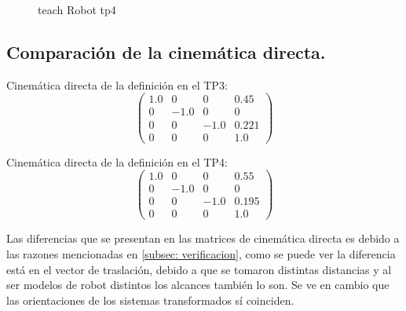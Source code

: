 \documentclass[a4paper,12pt]{article}
\begin{document}
\begin{figure}[H]
    \centering
    \begin{adjustbox}{scale = 0.85, max width=\columnwidth}
    \end{adjustbox}
    \caption{teach Robot tp4}
\end{figure}

\subsection{Comparación de la cinemática directa.}
Cinemática directa de la definición en el TP3: 
\[\left(\begin{array}{cccc} 1.0 & 0 & 0 & 0.45\\ 0 & -1.0 & 0 & 0\\ 0 & 0 & -1.0 & 0.221\\ 0 & 0 & 0 & 1.0 \end{array}\right)\]

Cinemática directa de la definición en el TP4: 
\[\left(\begin{array}{cccc} 1.0 & 0 & 0 & 0.55\\ 0 & -1.0 & 0 & 0\\ 0 & 0 & -1.0 & 0.195\\ 0 & 0 & 0 & 1.0 \end{array}\right)\]

Las diferencias que se presentan en las matrices de cinemática directa es
debido a las razones mencionadas en \cref{subsec: verificacion}, como se puede ver
la diferencia está en el vector de traslación, debido a que se tomaron distintas distancias y al ser modelos de
robot distintos los alcances también lo son. Se ve en cambio que las orientaciones de los sistemas
transformados sí coinciden.
\end{document}

